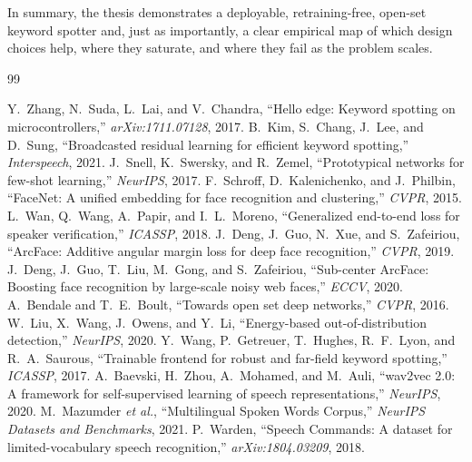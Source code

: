 \documentclass[12pt,a4paper]{article}
\begin{document}
In summary, the thesis demonstrates a deployable, retraining-free, open-set
keyword spotter and, just as importantly, a clear empirical map of which design
choices help, where they saturate, and where they fail as the problem scales.

\begin{thebibliography}{99}
\footnotesize

 Y.~Zhang, N.~Suda, L.~Lai, and V.~Chandra,
``Hello edge: Keyword spotting on microcontrollers,'' \emph{arXiv:1711.07128}, 2017.
 B.~Kim, S.~Chang, J.~Lee, and D.~Sung,
``Broadcasted residual learning for efficient keyword spotting,'' \emph{Interspeech}, 2021.
 J.~Snell, K.~Swersky, and R.~Zemel,
``Prototypical networks for few-shot learning,'' \emph{NeurIPS}, 2017.
 F.~Schroff, D.~Kalenichenko, and J.~Philbin,
``FaceNet: A unified embedding for face recognition and clustering,'' \emph{CVPR}, 2015.
 L.~Wan, Q.~Wang, A.~Papir, and I.~L.~Moreno,
``Generalized end-to-end loss for speaker verification,'' \emph{ICASSP}, 2018.
 J.~Deng, J.~Guo, N.~Xue, and S.~Zafeiriou,
``ArcFace: Additive angular margin loss for deep face recognition,'' \emph{CVPR}, 2019.
 J.~Deng, J.~Guo, T.~Liu, M.~Gong, and S.~Zafeiriou,
``Sub-center ArcFace: Boosting face recognition by large-scale noisy web faces,'' \emph{ECCV}, 2020.
 A.~Bendale and T.~E.~Boult,
``Towards open set deep networks,'' \emph{CVPR}, 2016.
 W.~Liu, X.~Wang, J.~Owens, and Y.~Li,
``Energy-based out-of-distribution detection,'' \emph{NeurIPS}, 2020.
 Y.~Wang, P.~Getreuer, T.~Hughes, R.~F.~Lyon, and R.~A.~Saurous,
``Trainable frontend for robust and far-field keyword spotting,'' \emph{ICASSP}, 2017.
 A.~Baevski, H.~Zhou, A.~Mohamed, and M.~Auli,
``wav2vec 2.0: A framework for self-supervised learning of speech representations,'' \emph{NeurIPS}, 2020.
 M.~Mazumder \emph{et al.},
``Multilingual Spoken Words Corpus,'' \emph{NeurIPS Datasets and Benchmarks}, 2021.
 P.~Warden,
``Speech Commands: A dataset for limited-vocabulary speech recognition,'' \emph{arXiv:1804.03209}, 2018.

\end{thebibliography}
\end{document}
